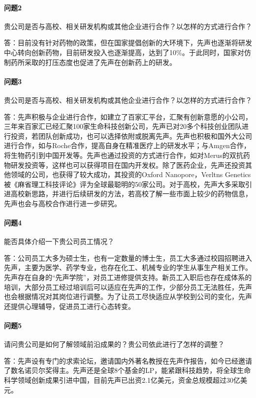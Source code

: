 \documentclass[twocolumn,openany]{ctexbook}
\begin{document}
	\paragraph{问题2}贵公司是否与高校、相关研发机构或其他企业进行合作？以怎样的方式进行合作？
	
	答：目前没有针对药物的政策，但在国家提倡创新的大环境下，先声也逐渐将研发中心转向创新药物，目前研发投入也逐渐提高，达到了10\%。于此同时，国家对仿制药所采取的打压态度也促进了先声在创新药上的研发。
	
	\paragraph{问题3}贵公司是否与高校、相关研发机构或其他企业进行合作？以怎样的方式进行合作？
	
	答：先声积极与企业进行合作，如建立了百家汇平台，汇聚有创新意愿的小公司，三年来百家汇已经汇聚100家生命科技创新公司，先声已对20多个科技创业团队进行投资，若团队创新成功，也可以选择依附或脱离先声。先声也积极和国外大公司进行合作，如与Roche合作，提高自身在精准医疗上的研发水平；与Amgen合作，将生物药引到中国开发等。先声也通过投资的方式进行合作，如对Merus的双抗药物研发投资等，这样也可以获得项目在国内开发权。除了医药企业，先声还投资其他领域的公司，也获得了较大成功，其投资的Oxford Nanopore，Verltns Genetics被《麻省理工科技评论》评为全球最聪明的50家公司。对于高校，先声大多采取引进高校新思路，并进行后续研发的方法，若高校了解一些市面上较少的药物信息，先声也会与高校合作进行进一步研究。
	
	\paragraph{问题4}能否具体介绍一下贵公司员工情况？
	
	答：公司员工大多为硕士生，也有一定数量的博士生，员工大多通过校园招聘进入先声，主要为医学、药学专业，也存在化工、机械专业的学生从事生产相关工作。先声存在自身的“先声学院”，对员工进修提供支持。新员工入职后也存在成体系的培训，大部分员工经过培训后可以适应在先声的工作，少部分员工无法胜任，先声也会根据情况对其岗位进行调整。为了让员工尽快适应从学校到公司的变化，先声还提供心理辅导，促进员工进行心态转变。
	
	\paragraph{问题5}请问贵公司是如何了解领域前沿成果的？贵公司依此进行了怎样的调整？
	
	答：先声设有专门的求索论坛，邀请国内外著名教授在先声作报告，如今已经邀请了数名诺贝尔奖得主。先声还是全球8个基金的LP，能紧跟科技趋势，将全球生命科学领域创新成果引进中国，目前先声已出资2.1亿美元，资金总规模超过30亿美元。
	
\end{document}
